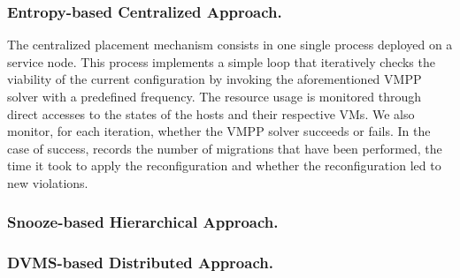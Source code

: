 \subsubsection{Entropy-based Centralized Approach.}
\label{subsec:entropy}

The centralized placement mechanism consists in one single \sg
process deployed on a service node. This process implements a simple loop that
iteratively checks the viability of the current configuration by
invoking the aforementioned VMPP solver with a predefined
frequency.
%
The resource usage is monitored through direct accesses
to the states of the hosts and their respective VMs.
%
%
We also monitor, for each iteration, whether the VMPP solver succeeds
or fails. In the case of success, \vmps records the number of migrations
that have been performed, the time it took to apply the
reconfiguration and whether the reconfiguration
led to new violations.

\subsubsection{Snooze-based Hierarchical Approach.}
\label{subsec:snooze}


\subsubsection{DVMS-based Distributed Approach.}
\label{subsec:dvms}



